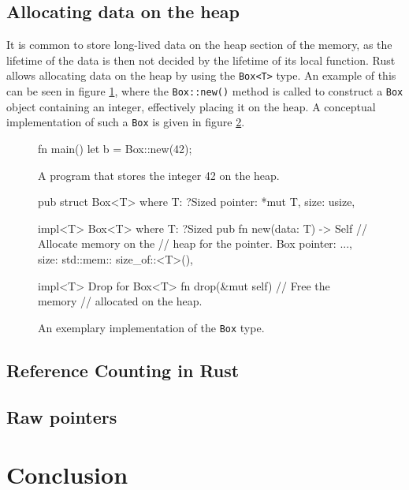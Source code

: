 \documentclass[twocolumn]{article}
\begin{document}
\subsection{Allocating data on the heap}
It is common to store long-lived data on the heap section of the memory, as the lifetime of the data is then not decided by the lifetime of its local function. Rust allows allocating data on the heap by using the \texttt{Box<T>} type\cite{RustDoc-Box}. An example of this can be seen in figure \ref{box-intro}, where the \texttt{Box::new()} method is called to construct a \texttt{Box} object containing an integer, effectively placing it on the heap. A conceptual implementation of such a \texttt{Box} is given in figure \ref{box-implementation}. 
\begin{figure}
\begin{rustcode}
fn main() {
    let b = Box::new(42);
}
\end{rustcode}
\vspace{-2em}
\caption{A program that stores the integer 42 on the heap.}
\label{box-intro}
\end{figure}
\begin{figure}
\begin{rustcode}
pub struct Box<T> where T: ?Sized {
    pointer: *mut T,
    size: usize,
}

impl<T> Box<T> where T: ?Sized {
    pub fn new(data: T) -> Self {
        // Allocate memory on the
        // heap for the pointer.
        Box {
            pointer: ...,
            size: std::mem::
                   size_of::<T>(),
        }
    }
}

impl<T> Drop for Box<T> {
    fn drop(&mut self) {
        // Free the memory 
        // allocated on the heap.
    }
}
\end{rustcode}
\vspace{-2em}
\caption{An exemplary implementation of the \texttt{Box} type.}
\label{box-implementation}
\end{figure}
\subsection{Reference Counting in Rust}
\subsection{Raw pointers}
\section{Conclusion}
\end{document}
